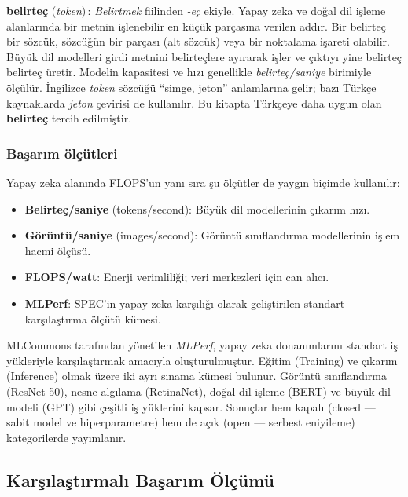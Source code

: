 \begin{terimnotu}
\textbf{belirteç} (\emph{token})\,: \emph{Belirtmek} fiilinden \emph{-eç} ekiyle. Yapay zeka ve doğal dil işleme alanlarında bir metnin işlenebilir en küçük parçasına verilen addır. Bir belirteç bir sözcük, sözcüğün bir parçası (alt sözcük) veya bir noktalama işareti olabilir. Büyük dil modelleri girdi metnini belirteçlere ayırarak işler ve çıktıyı yine belirteç belirteç üretir. Modelin kapasitesi ve hızı genellikle \emph{belirteç/saniye} birimiyle ölçülür. İngilizce \emph{token} sözcüğü ``simge, jeton'' anlamlarına gelir; bazı Türkçe kaynaklarda \emph{jeton} çevirisi de kullanılır. Bu kitapta Türkçeye daha uygun olan \textbf{belirteç} tercih edilmiştir.
\end{terimnotu}

\subsubsection*{Başarım ölçütleri}
Yapay zeka alanında FLOPS'un yanı sıra şu ölçütler de yaygın biçimde kullanılır:
\begin{itemize}
    \item \textbf{Belirteç/saniye} (tokens/second): Büyük dil modellerinin çıkarım hızı.
    \item \textbf{Görüntü/saniye} (images/second): Görüntü sınıflandırma modellerinin işlem hacmi ölçüsü.
    \item \textbf{FLOPS/watt}: Enerji verimliliği; veri merkezleri için can alıcı.
    \item \textbf{MLPerf}: SPEC'in yapay zeka karşılığı olarak geliştirilen standart karşılaştırma ölçütü kümesi.
\end{itemize}

\begin{bilginot}\label{bn:mlperf}
MLCommons tarafından yönetilen \emph{MLPerf}, yapay zeka donanımlarını standart iş yükleriyle karşılaştırmak amacıyla oluşturulmuştur. Eğitim (Training) ve çıkarım (Inference) olmak üzere iki ayrı sınama kümesi bulunur. Görüntü sınıflandırma (ResNet-50), nesne algılama (RetinaNet), doğal dil işleme (BERT) ve büyük dil modeli (GPT) gibi çeşitli iş yüklerini kapsar. Sonuçlar hem kapalı (closed --- sabit model ve hiperparametre) hem de açık (open --- serbest eniyileme) kategorilerde yayımlanır.
\end{bilginot}


\subsection{Karşılaştırmalı Başarım Ölçümü}
\label{subsec:karsilastirmali-basarim}

